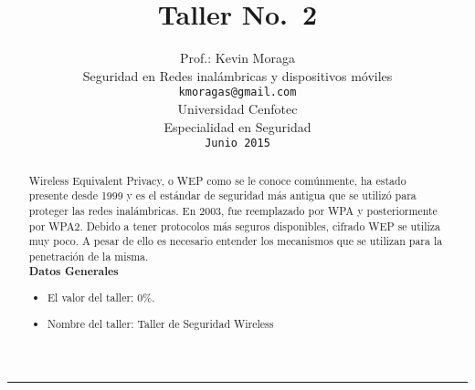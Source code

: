 \documentclass[11pt,a4paper]{scrartcl}			%
\title{Taller No.\ 2}
\author{%
	Prof.: Kevin Moraga \\
	Seguridad en Redes inalámbricas y dispositivos móviles \\
	\texttt{kmoragas@gmail.com}\vspace{40pt} \\
	Universidad Cenfotec \\
	Especialidad en Seguridad \\
	\texttt{Junio 2015}
	}
\makeatletter
\def\printtitle{%
    {\centering \huge \normalfont \textbf{\@title}\par}}		%
\def\printauthor{%
    {\large \@author}}				%
\makeatother
\begin{document}
\begin{minipage}{0.35\linewidth}
	\begin{flushright}
		\printauthor
	\end{flushright}
\end{minipage} \hspace{0pt}
%
\begin{minipage}{0.02\linewidth}
	\rule{3pt}{175pt}
\end{minipage} \hspace{0pt}
%
\begin{minipage}{0.63\linewidth}
\printtitle 
\vspace{5pt}
	\begin{abstract} 
Wireless Equivalent Privacy, o WEP como se le conoce comúnmente, ha estado presente desde 1999 y es el estándar de seguridad más antigua que se utilizó para proteger las redes inalámbricas. En 2003, fue reemplazado por WPA y posteriormente por WPA2. Debido a tener protocolos más seguros disponibles, cifrado WEP se utiliza muy poco. A pesar de ello es necesario entender los mecanismos que se utilizan para la penetración de la misma. 
\\

\textbf{Datos Generales}
\begin{itemize}
\item El valor del taller: 0\%.
\item Nombre del taller:  Taller de Seguridad Wireless
\end{itemize}
	\end{abstract}
\end{minipage}
\vspace{20pt}		%


\setlength{\columnsep}{0.5cm}

\end{document}
